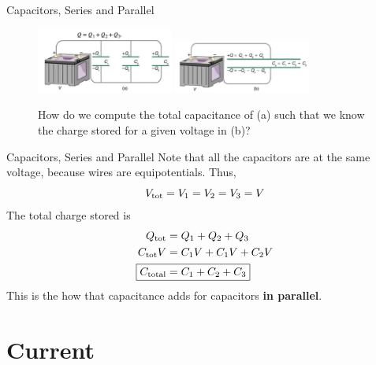 \documentclass{beamer}
\begin{document}
\begin{frame}{Capacitors, Series and Parallel}
\begin{figure}
\centering
\includegraphics[width=0.4\textwidth]{figures/cap3.png} \hspace{0.2cm}
\includegraphics[width=0.4\textwidth]{figures/cap4.png}
\caption{\label{fig:cap2} How do we compute the total capacitance of (a) such that we know the charge stored for a given voltage in (b)?}
\end{figure}
\end{frame}

\begin{frame}{Capacitors, Series and Parallel}
Note that all the capacitors are at the same voltage, because wires are equipotentials.  Thus,
\begin{equation}
V_{\rm tot} = V_1 = V_2 = V_3 = V
\end{equation}
The total charge stored is
\begin{align}
Q_{\rm tot} &= Q_1 + Q_2 + Q_3 \\
C_{\rm tot} V &= C_1 V + C_1 V + C_2 V \\
\Aboxed{C_{\rm total} &= C_1+C_2+C_3}
\end{align}
This is the how that capacitance adds for capacitors \textbf{in parallel}.
\end{frame}

\section{Current}
\end{document}
